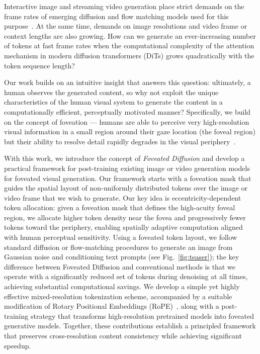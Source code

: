     
Interactive image and streaming video generation place strict demands on the frame rates of emerging diffusion and flow matching models used for this purpose~\cite{bruce2024genie,alonso2024diffusion,che2024gamegen,decart2024oasis,feng2024matrix,jin2024pyramidal,kodaira2025genie3,song2025history,valevski2024diffusion,weng2024art,yu2025gamefactory,henschel2025streamingt2v,wu2025spmem,po2025long,zhang2025frame,yin2025slow}. At the same time, demands on image resolutions and video frame or context lengths are also growing. How can we generate an ever-increasing number of tokens at fast frame rates when the computational complexity of the attention mechanism in modern diffusion transformers (DiTs) \cite{peebles2023dit} grows quadratically with the token sequence length?


Our work builds on an intuitive insight that answers this question: ultimately, a human observes the generated content, so why not exploit the unique characteristics of the human visual system to generate the content in a computationally efficient, perceptually motivated manner? Specifically, we build on the concept of foveation --- humans are able to perceive very high-resolution visual information in a small region around their gaze location (the foveal region) but their ability to resolve detail rapidly degrades in the visual periphery~\cite{anstis1974chart,weymouth1958visual}. 

With this work, we introduce the concept of \emph{Foveated Diffusion} and develop a practical framework for post-training existing image or video generation models for foveated visual generation. Our framework starts with a foveation mask that guides the spatial layout of non-uniformly distributed tokens over the image or video frame that we wish to generate. Our key idea is eccentricity-dependent token allocation: given a foveation mask that defines the high-acuity foveal region, we allocate higher token density near the fovea and progressively fewer tokens toward the periphery, enabling spatially adaptive computation aligned with human perceptual sensitivity.
% 
Using a foveated token layout, we follow standard diffusion or flow-matching procedures to generate an image from Gaussian noise and conditioning text prompts (see Fig.~\ref{fig:teaser}); the key difference between Foveated Diffusion and conventional methods is that we operate with a significantly reduced set of tokens during denoising at all times, achieving substantial computational savings. We develop a simple yet highly effective mixed-resolution tokenization scheme, accompanied by a suitable modification of Rotary Positional Embeddings (RoPE)~\cite{su2024roformer,wu2025crpa}, along with a post-training strategy that transforms high-resolution pretrained models into foveated generative models. Together, these contributions establish a principled framework that preserves cross-resolution content consistency while achieving significant speedup.

